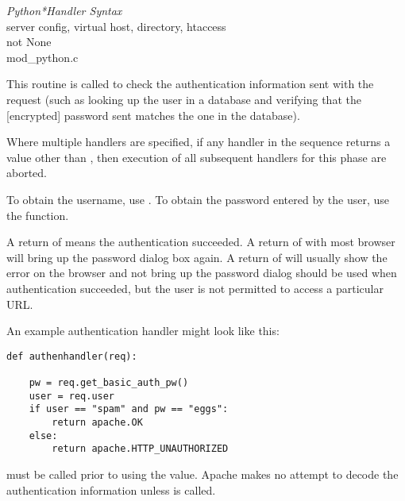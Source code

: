 \emph{Python*Handler Syntax}\\
server config, virtual host, directory, htaccess\\
not None\\
mod_python.c

This routine is called to check the authentication information sent
with the request (such as looking up the user in a database and
verifying that the [encrypted] password sent matches the one in the
database).

Where multiple handlers are specified, if any handler in the sequence
returns a value other than , then execution of all
subsequent handlers for this phase are aborted.

To obtain the username, use . To obtain the password
entered by the user, use the  function.

A return of  means the authentication succeeded. A
return of  with most browser will bring
up the password dialog box again. A return of
 will usually show the error on the
browser and not bring up the password dialog
 should be used when authentication
succeeded, but the user is not permitted to access a particular URL.

An example authentication handler might look like this: 

\begin{verbatim}
def authenhandler(req):

    pw = req.get_basic_auth_pw()
    user = req.user     
    if user == "spam" and pw == "eggs":
        return apache.OK
    else:
        return apache.HTTP_UNAUTHORIZED
\end{verbatim}    

\begin{notice}
   must be called prior to using the
   value. Apache makes no attempt to decode the
  authentication information unless  is called.
\end{notice}

